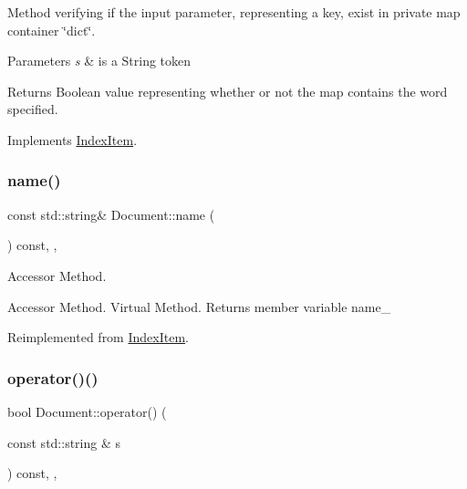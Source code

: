 Method verifying if the input parameter, representing a key, exist in private map container \char`\"{}dict\char`\"{}.


\begin{DoxyParams}{Parameters}
{\em s} & is a String token \\
\hline
\end{DoxyParams}
\begin{DoxyReturn}{Returns}
Boolean value representing whether or not the map contains the word specified. 
\end{DoxyReturn}


Implements \hyperlink{class_index_item_a534d96bf041a485ed124663b9cded2fb}{Index\+Item}.

\mbox{\label{class_document_a68936706468433f1bbba813797e32bd5}} 
\subsubsection{\texorpdfstring{name()}{name()}}
{\footnotesize\ttfamily const std\+::string\& Document\+::name (\begin{DoxyParamCaption}{ }\end{DoxyParamCaption}) const\hspace{0.3cm}{\ttfamily [inline]}, {\ttfamily [override]}, {\ttfamily [virtual]}}



Accessor Method. 

Accessor Method. Virtual Method. Returns member variable name\+\_\+ 

Reimplemented from \hyperlink{class_index_item_a059cbae312c51ae7d02050f8f325bf93}{Index\+Item}.

\mbox{\label{class_document_a44b8141f08f57f9122b3dba4a59bf7e4}} 
\subsubsection{\texorpdfstring{operator()()}{operator()()}}
{\footnotesize\ttfamily bool Document\+::operator() (\begin{DoxyParamCaption}\item[{const std\+::string \&}]{s }\end{DoxyParamCaption}) const\hspace{0.3cm}{\ttfamily [inline]}, {\ttfamily [override]}, {\ttfamily [virtual]}}



